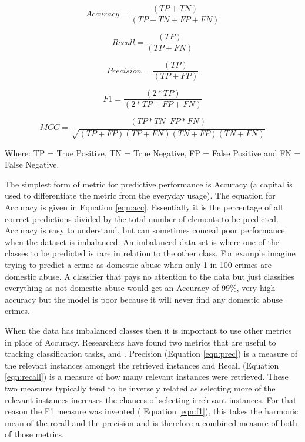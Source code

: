 \begin{equation}
Accuracy =  \frac{(TP+TN)}{(TP + TN + FP + FN)}
\label{eqn:acc}
\end{equation}

\begin{equation}
Recall =  \frac{(TP)}{(TP + FN)}
\label{eqn:recall}
\end{equation}

\begin{equation}
Precision=  \frac{(TP)}{(TP + FP)}
\label{eqn:prec}
\end{equation}

\begin{equation}
F1 =  \frac{(2 * TP)}{(2*TP + FP + FN)}
\label{eqn:f1}
\end{equation}

\begin{equation}
MCC =  \frac{(TP*TN – FP*FN)}{\sqrt{(TP+FP)(TP+FN)(TN+FP)(TN+FN)}}
\label{eqn:mcc}
\end{equation}

Where: TP = True Positive, TN = True Negative, FP = False Positive and FN = False Negative.

The simplest form of metric for predictive performance is Accuracy (a capital  is used to differentiate the metric from the everyday usage). The equation for Accuracy is given in Equation \ref{eqn:acc}. Essentially it is the percentage of all correct predictions divided by the total number of elements to be predicted. Accuracy is easy to understand, but can sometimes conceal poor performance when the dataset is imbalanced. An imbalanced data set is where one of the classes to be predicted is rare in relation to the other class. For example imagine trying to predict a crime as domestic abuse when only 1 in 100 crimes are domestic abuse. A classifier that pays no attention to the data but just classifies everything as not-domestic abuse would get an Accuracy of 99\%, very high accuracy but the model is poor because it will never find any domestic abuse crimes.

When the data has imbalanced classes then it is important to use other metrics in place of Accuracy. Researchers have found two metrics that are useful to tracking classification tasks,  and  \parencite[Chapter~5]{witten_frank_hall_pal_2017}. Precision (Equation \ref{eqn:prec}) is a measure of the relevant instances amongst the retrieved instances and Recall (Equation \ref{eqn:recall}) is a measure of how many relevant instances were retrieved. These two measures typically tend to be inversely related as selecting more of the relevant instances increases the chances of selecting irrelevant instances. For that reason the F1 measure was invented ( Equation \ref{eqn:f1}), this takes the harmonic mean of the recall and the precision and is therefore a combined measure of both of those metrics. 

